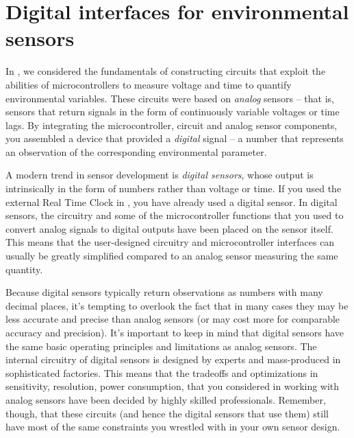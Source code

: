 \setchapterpreamble[u]{\margintoc}
\chapter{Digital interfaces for environmental sensors}

In , we considered the fundamentals of constructing circuits that exploit the abilities of microcontrollers to measure voltage and time to quantify environmental variables.
These circuits were based on \textit{analog} sensors -- that is, sensors that return signals in the form of continuously variable voltages or time lags.
By integrating the microcontroller, circuit and analog sensor components, you assembled a device that provided a \textit{digital} signal -- a number that represents an observation of the corresponding environmental parameter.

A modern trend in sensor development is \textit{digital sensors}, whose output is intrinsically in the form of numbers rather than voltage or time.
If you used the external  Real Time Clock in , you have already used a digital sensor.
In digital sensors, the circuitry and some of the microcontroller functions that you used to convert analog signals to digital outputs have been placed on the sensor itself.
This means that the user-designed circuitry and microcontroller interfaces can usually be greatly simplified compared to an analog sensor measuring the same quantity.

Because digital sensors typically return observations as numbers with many decimal places, it's tempting to overlook the fact that in many cases they may be less accurate and precise than analog sensors (or may cost more for comparable accuracy and precision).
It's important to keep in mind that digital sensors have the same basic operating principles and limitations as analog sensors.
The internal circuitry of digital sensors is designed by experts and mass-produced in sophisticated factories.
This means that the tradeoffs and optimizations in sensitivity, resolution, power consumption, \etc that you considered in working with analog sensors have been decided by highly skilled professionals.
Remember, though, that these circuits (and hence the digital sensors that use them) still have most of the same constraints you wrestled with in your own sensor design.

